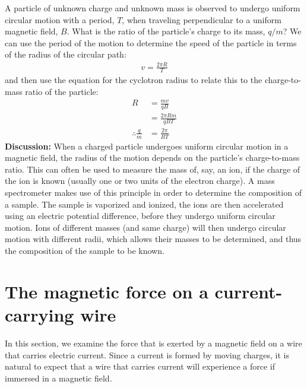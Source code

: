 \begin{example}{\label{ex:magneticforce:massspec}A particle of unknown charge and unknown mass is observed to undergo uniform circular motion with a period, $T$, when traveling perpendicular to a uniform magnetic field, $B$. What is the ratio of the particle's charge to its mass, $q/m$? }
We can use the period of the motion to determine the speed of the particle in terms of the radius of the circular path:
\begin{align*}
v = \frac{2\pi R}{T}
\end{align*}
and then use the equation for the cyclotron radius to relate this to the charge-to-mass ratio of the particle:
\begin{align*}
R &= \frac{mv}{qB}\\
  &= \frac{2\pi R m}{qBT}\\
\therefore \frac{q}{m} &= \frac{2\pi}{BT} 
\end{align*}
\textbf{Discussion:} When a charged particle undergoes uniform circular motion in a magnetic field, the radius of the motion depends on the particle's charge-to-mass ratio. This can often be used to measure the mass of, say, an ion, if the charge of the ion is known (usually one or two units of the electron charge). A mass spectrometer makes use of this principle in order to determine the composition of a sample. The sample is vaporized and ionized, the ions are then accelerated using an electric potential difference, before they undergo uniform circular motion. Ions of different masses (and same charge) will then undergo circular motion with different radii, which allows their masses to be determined, and thus the composition of the sample to be known.
\end{example}

\section{The magnetic force on a current-carrying wire}
In this section, we examine the force that is exerted by a magnetic field on a wire that carries electric current. Since a current is formed by moving charges, it is natural to expect that a wire that carries current will experience a force if immersed in a magnetic field. 

